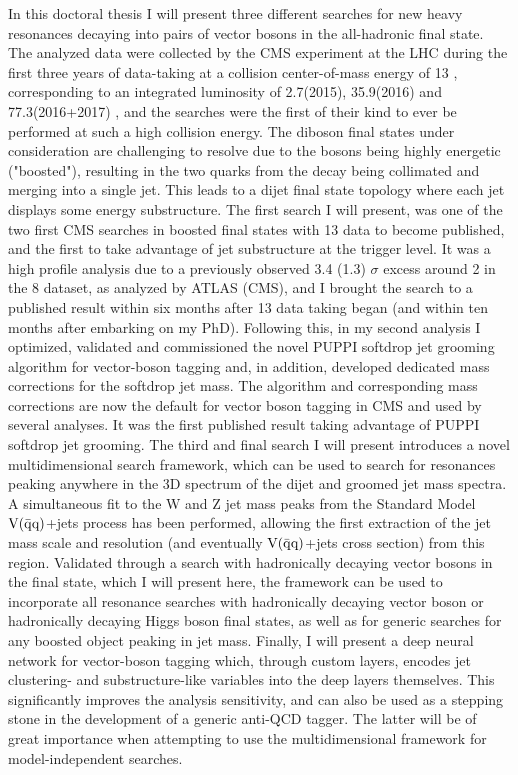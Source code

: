 \small
\noindent In this doctoral thesis I will present three different searches for new heavy resonances decaying into pairs of vector bosons in the all-hadronic final state. The analyzed data were collected by the CMS experiment at the LHC during the first three years of data-taking at a collision center-of-mass energy of 13 \TeV, corresponding to an integrated luminosity of 2.7(2015), 35.9(2016) and 77.3(2016+2017) \fbinv, and the searches were the first of their kind to ever be performed at such a high collision energy. The diboson final states under consideration are challenging to resolve due to the bosons being highly energetic ("boosted"), resulting in the two quarks from the decay being collimated and merging into a single jet. This leads to a dijet final state topology where each jet displays some energy substructure. The first search I will present, was one of the two first CMS searches in boosted final states with 13 \TeV data to become published, and the first to take advantage of jet substructure at the trigger level. It was a high profile analysis due to a previously observed 3.4 (1.3) $\sigma$ excess around 2 \TeV in the 8 \TeV dataset, as analyzed by ATLAS (CMS), and I brought the search to a published result within six months after 13 \TeV data taking began (and within ten months after embarking on my PhD). Following this, in my second analysis I optimized, validated and commissioned the novel PUPPI softdrop jet grooming algorithm for vector-boson tagging and, in addition, developed dedicated mass corrections for the softdrop jet mass. The algorithm and corresponding mass corrections are now the default for vector boson tagging in CMS and used by several analyses. It was the first published result taking advantage of PUPPI softdrop jet grooming. The third and final search I will present introduces a novel multidimensional search framework, which can be used to search for resonances peaking anywhere in the 3D spectrum of the dijet and groomed jet mass spectra. A simultaneous fit to the W and Z jet mass peaks from the Standard Model $\mathrm{V}(\bar{\rm{q}}\rm{q})$+jets process has been performed, allowing the first extraction of the jet mass scale and resolution (and eventually $\mathrm{V}(\bar{\rm{q}}\rm{q})$+jets cross section) from this region. Validated through a search with hadronically decaying vector bosons in the final state, which I will present here, the framework can be used to incorporate all resonance searches with hadronically decaying vector boson or hadronically decaying Higgs boson final states, as well as for generic searches for any boosted object peaking in jet mass. Finally, I will present a deep neural network for vector-boson tagging which, through custom layers, encodes jet clustering- and substructure-like variables into the deep layers themselves. This significantly improves the analysis sensitivity, and can also be used as a stepping stone in the development of a generic anti-QCD tagger. The latter will be of great importance when attempting to use the multidimensional framework for model-independent searches.